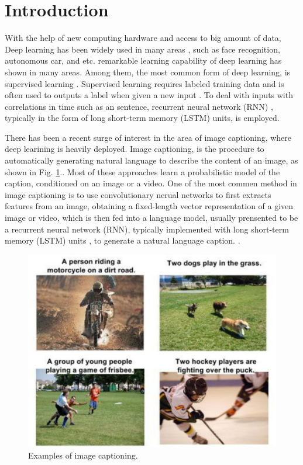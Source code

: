 \documentclass[conference]{IEEEtran}
\begin{document}
\IEEEpeerreviewmaketitle



\section{Introduction}

With the help of new computing hardware and access to big amount of data, Deep learning has been widely used in many areas \cite{krizhevsky2012imagenet}, such as face recognition, autonomous car, and etc. remarkable learning capability of deep learning has shown in many areas. Among them, the most common form of deep learning, is supervised learning \cite{lecun2015deep}. Supervised learning requires labeled training data and is often used to outputs a label when given a new input \cite{lecun1998gradient}. To deal with inputs with correlations in time such as an sentence, recurrent neural network (RNN) \cite{mikolov2010recurrent}, typically in the form of long short-term memory (LSTM) units, is employed.

There has been a recent surge of interest in the area of image captioning, where deep learining is heavily deployed. Image captioning, is the procedure to automatically generating natural language to describe the content of an image, as shown in Fig. \ref{cap_fig}.. Most of these approaches learn a probabilistic model of the caption, conditioned on an image or a video. One of the most commen method in image captioning is to use convolutionary nerual networks to first extracts features from an image, obtaining a fixed-length vector representation of a given image or video, which is then fed into a language model, usually prensented to be a recurrent neural network (RNN), typically implemented with long short-term memory (LSTM) units \cite{graves2013speech}, to generate a natural language caption. \cite{vinyals2015show}.

\begin{figure}
  \centering
  \includegraphics[width=1.0\linewidth]{figures/caption.pdf}
  \caption{Examples of image captioning.}\label{cap_fig}
\end{figure}
\end{document}
